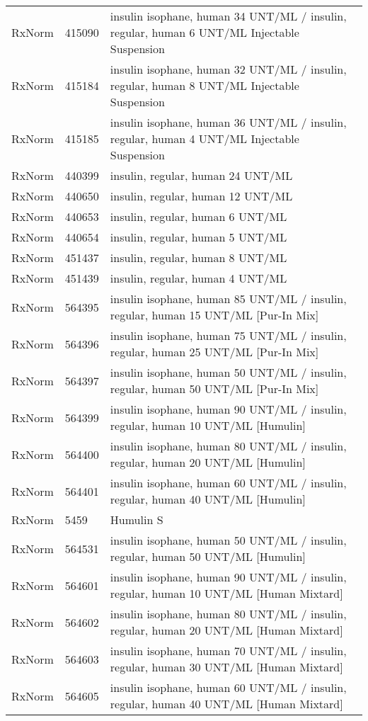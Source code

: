 \begin{longtable}{p{}p{}p{}}
  RxNorm & 415090 & insulin isophane, human 34 UNT/ML / insulin, regular, human 6 UNT/ML Injectable Suspension \\ 
  RxNorm & 415184 & insulin isophane, human 32 UNT/ML / insulin, regular, human 8 UNT/ML Injectable Suspension \\ 
  RxNorm & 415185 & insulin isophane, human 36 UNT/ML / insulin, regular, human 4 UNT/ML Injectable Suspension \\ 
  RxNorm & 440399 & insulin, regular, human 24 UNT/ML \\ 
  RxNorm & 440650 & insulin, regular, human 12 UNT/ML \\ 
  RxNorm & 440653 & insulin, regular, human 6 UNT/ML \\ 
  RxNorm & 440654 & insulin, regular, human 5 UNT/ML \\ 
  RxNorm & 451437 & insulin, regular, human 8 UNT/ML \\ 
  RxNorm & 451439 & insulin, regular, human 4 UNT/ML \\ 
  RxNorm & 564395 & insulin isophane, human 85 UNT/ML / insulin, regular, human 15 UNT/ML [Pur-In Mix] \\ 
  RxNorm & 564396 & insulin isophane, human 75 UNT/ML / insulin, regular, human 25 UNT/ML [Pur-In Mix] \\ 
  RxNorm & 564397 & insulin isophane, human 50 UNT/ML / insulin, regular, human 50 UNT/ML [Pur-In Mix] \\ 
  RxNorm & 564399 & insulin isophane, human 90 UNT/ML / insulin, regular, human 10 UNT/ML [Humulin] \\ 
  RxNorm & 564400 & insulin isophane, human 80 UNT/ML / insulin, regular, human 20 UNT/ML [Humulin] \\ 
  RxNorm & 564401 & insulin isophane, human 60 UNT/ML / insulin, regular, human 40 UNT/ML [Humulin] \\ 
  RxNorm & 5459 & Humulin S \\ 
  RxNorm & 564531 & insulin isophane, human 50 UNT/ML / insulin, regular, human 50 UNT/ML [Humulin] \\ 
  RxNorm & 564601 & insulin isophane, human 90 UNT/ML / insulin, regular, human 10 UNT/ML [Human Mixtard] \\ 
  RxNorm & 564602 & insulin isophane, human 80 UNT/ML / insulin, regular, human 20 UNT/ML [Human Mixtard] \\ 
  RxNorm & 564603 & insulin isophane, human 70 UNT/ML / insulin, regular, human 30 UNT/ML [Human Mixtard] \\ 
  RxNorm & 564605 & insulin isophane, human 60 UNT/ML / insulin, regular, human 40 UNT/ML [Human Mixtard] \\ 

\end{longtable}
